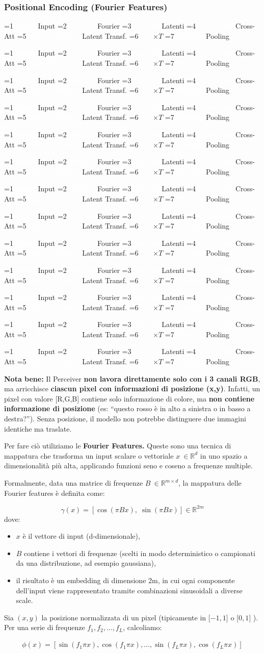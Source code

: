 \documentclass[
  11pt,
]{article}
\newcommand{\pipelinestep}[2]{%
  \ifnum#2=1
    \tikz[baseline=(n.base)]{\node[draw=seccolor, fill=seccolor!15, rounded corners=2pt,
      inner sep=2pt, font=\footnotesize\bfseries] (n) {#1};}%
  \else
    \tikz[baseline=(n.base)]{\node[draw=boxframe, rounded corners=2pt,
      inner sep=2pt, font=\footnotesize] (n) {#1};}%
  \fi
}
\newcommand{\parr}{{\footnotesize\;$\to$\;}}
\newcommand{\pipeline}[1]{%
\begin{tcolorbox}[colback=white, colframe=seccolor!60, boxrule=0.6pt, arc=4pt,
  left=4pt, right=4pt, top=5pt, bottom=5pt, title={\footnotesize\bfseries\color{white} Forward Pass Pipeline}, fonttitle=\footnotesize, coltitle=white, colbacktitle=seccolor!70]
\centering
\pipelinestep{Input}{%
  \ifnum#1=1 1\else 0\fi}%
\parr\pipelinestep{Fourier}{%
  \ifnum#1=2 1\else 0\fi}%
\parr\pipelinestep{Embedding}{%
  \ifnum#1=3 1\else 0\fi}%
\parr\pipelinestep{Latent Array}{%
  \ifnum#1=4 1\else 0\fi}%
\parr\pipelinestep{Cross-Att}{%
  \ifnum#1=5 1\else 0\fi}%
\parr\pipelinestep{Res+MLP}{%
  \ifnum#1=6 1\else 0\fi}%
\\[4pt]
\pipelinestep{Latent Transf.}{%
  \ifnum#1=7 1\else 0\fi}%
\parr\pipelinestep{Res+MLP}{%
  \ifnum#1=8 1\else 0\fi}%
\parr\pipelinestep{$\times T$}{%
  \ifnum#1=9 1\else 0\fi}%
\parr\pipelinestep{Pooling}{%
  \ifnum#1=10 1\else 0\fi}%
\parr\pipelinestep{Classifier}{%
  \ifnum#1=11 1\else 0\fi}%
\parr\pipelinestep{Loss}{%
  \ifnum#1=12 1\else 0\fi}%
\end{tcolorbox}
}
\newcommand{\mystripchip}[3]{%
  \setlength{\fboxsep}{2.8pt}%
  \ifnum#3=#1\relax
    \colorbox{seccolor}{\textcolor{white}{\bfseries #2}}%
  \else
    \colorbox{seccolor!8}{\textcolor{seccolor!55}{#2}}%
  \fi}
\newcommand{\mystriparr}{{\fontsize{8}{8}\selectfont\;\textcolor{seccolor!45}{$\rightarrow$}\;}}
\newcommand{\mystrip}[1]{%
\begin{center}
{\sffamily\fontsize{7.5}{9}\selectfont
\mystripchip{1}{Input}{#1}\mystriparr\mystripchip{2}{Fourier}{#1}\mystriparr\mystripchip{3}{Latenti}{#1}\mystriparr%
\mystripchip{4}{Cross-Att}{#1}\mystriparr\mystripchip{5}{Latent Transf.}{#1}\mystriparr%
\mystripchip{6}{$\times T$}{#1}\mystriparr\mystripchip{7}{Pooling}{#1}}
\end{center}}
\renewcommand{\pipeline}[1]{%
  \ifcase#1\relax
    \mystrip{0}%
    \or\mystrip{1}%
    \or\mystrip{2}%
    \or\mystrip{2}%
    \or\mystrip{3}%
    \or\mystrip{4}%
    \or\mystrip{4}%
    \or\mystrip{5}%
    \or\mystrip{5}%
    \or\mystrip{6}%
    \or\mystrip{7}%
    \or\mystrip{7}%
    \or\mystrip{7}%
  \fi}
\begin{document}
\subsubsection{Positional Encoding (Fourier Features)}
\label{app:fourier}

\pipeline{2}

\textbf{Nota bene:} Il Perceiver \textbf{non lavora direttamente solo con i
3 canali RGB}, ma arricchisce \textbf{ciascun pixel con informazioni} \textbf{di
posizione (x,y)}. Infatti, un pixel con valore {[}R,G,B{]} contiene solo
informazione di colore, ma \textbf{non contiene informazione di
posizione} (es: ``questo rosso è in alto a sinistra o in basso a
destra?''). Senza posizione, il modello non potrebbe distinguere due
immagini identiche ma traslate.

Per fare ciò utiliziamo le \textbf{Fourier Features.} Queste sono una
tecnica di mappatura che trasforma un input scalare o vettoriale
\(x\  \in \mathbb{R}^{d}\) in uno spazio a dimensionalità più alta,
applicando funzioni seno e coseno a frequenze multiple.

Formalmente, data una matrice di frequenze
\(B\  \in \mathbb{R}^{m \times d}\), la mappatura delle Fourier features
è definita come:

\[
\gamma(x) = \left[ \cos(\pi B x),\; \sin(\pi B x) \right] \in \mathbb{R}^{2m}
\]dove:

\begin{itemize}
\item
  \(x\) è il vettore di input (d-dimensionale),
\item
  \(B\) contiene i vettori di frequenze (scelti in modo deterministico o
  campionati da una distribuzione, ad esempio gaussiana),
\item
  il risultato è un embedding di dimensione 2m, in cui ogni componente
  dell'input viene rappresentato tramite combinazioni sinusoidali a
  diverse scale.
\end{itemize}

Sia \((x,y)\) la posizione normalizzata di un pixel (tipicamente in
\(\lbrack - 1,1\rbrack \text{ o } \lbrack 0,1\rbrack\) ).\\
Per una serie di frequenze \(f_{1},f_{2},\ldots,f_{L}\), calcoliamo:

\[\begin{matrix}
\phi(x) = \left\lbrack \sin\left( f_{1}\pi x \right),\cos\left( f_{1}\pi x \right),\ldots,\sin\left( f_{L}\pi x \right),\cos\left( f_{L}\pi x \right) \right\rbrack \\

\end{matrix}\]
\end{document}
